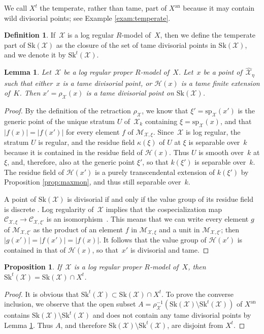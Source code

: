 \documentclass[11pt]{article}
\let\mathcal\mathscr
\newtheorem{prop}[equation]{Proposition}
\newtheorem{lemma}[equation]{Lemma}
\theoremstyle{definition}
\newtheorem{definition}[equation]{Definition}
\numberwithin{equation}{subsection}
\newcommand{\cX}{\ensuremath{\mathscr{X}}}
\newcommand{\an}{\mathrm{an}}
\newcommand{\Sk}{\mathrm{Sk}}
\newcommand{\spe}{\mathrm{sp}}
\begin{document}
We call $X^t$ the temperate, rather than tame, part of $X^{\an}$ because it may contain wild divisorial points; see Example \ref{exam:temperate}.

\begin{definition}
If~$\cX$ is a log regular $R$\nobreakdash-model of~$X$, then we define the temperate part of $\Sk(\cX)$
as the closure of the set of tame divisorial points in $\Sk(\cX)$, and we denote it by $\Sk^t(\cX)$.
\end{definition}

\begin{lemma}\label{lemm:tameretract}
Let~$\cX$ be a log regular proper $R$\nobreakdash-model of~$X$. Let~$x$ be a point of~$\widehat{\cX}_\eta$ such that either~$x$ is a tame divisorial point, or $\mathscr{H}(x)$ is a tame finite extension of~$K$. Then $x'=\rho_{\cX}(x)$ is a tame divisorial point on $\Sk(\cX)$.
\end{lemma}
\begin{proof}
By the definition of the retraction $\rho_{\cX}$, we know that $\xi'=\spe_{\cX}(x')$ is the generic point of the unique stratum $U$ of~$\cX_k$ containing $\xi=\spe_{\cX}(x)$, and that $|f(x)|=|f(x')|$ for every element $f$ of
$\mathcal{M}_{\cX,\xi}$. Since~$\cX$ is log regular, the stratum $U$ is regular, and the residue field $\kappa(\xi)$ of $U$ at $\xi$ is separable over~$k$ because it is contained in the residue field of $\mathscr{H}(x)$. Thus $U$ is smooth over~$k$ at $\xi$, and, therefore, also at the generic point $\xi'$, so that $k(\xi')$ is separable over~$k$. The residue field of $\mathscr{H}(x')$ is a purely transcendental extension of $k(\xi')$ by Proposition \ref{prop:maxmon}, and thus still separable over~$k$.

A point of $\Sk(\cX)$ is divisorial if and only if the value group of its residue field is discrete \cite[2.4.8]{MuNi}. Log regularity of~$\cX$ implies that the cospecialization map $\mathcal{C}_{\cX,\xi}\to \mathcal{C}_{\cX,\xi'}$ is an isomorphism~\cite[3.2.1]{logzeta}. This means that we can write every element $g$ of $\mathcal{M}_{\cX,\xi'}$ as the product of an element $f$ in $\mathcal{M}_{\cX,\xi}$ and a unit in $\mathcal{M}_{\cX,\xi'}$; then $|g(x')|=|f(x')|=|f(x)|$. It follows that the value group of $\mathscr{H}(x')$ is contained in that of $\mathscr{H}(x)$, so that~$x'$ is divisorial and tame.
\end{proof}

\begin{prop}\label{prop:tamesk}
If~$\cX$ is a log regular proper $R$\nobreakdash-model of~$X$, then $\Sk^t(\cX)=\Sk(\cX)\cap X^t$.
\end{prop}
\begin{proof}
It is obvious that $\Sk^t(\cX)\subset \Sk(\cX)\cap X^t$.
To prove the converse inclusion, we observe that the open subset $A=\rho_{\cX}^{-1}(\Sk(\cX)\setminus \Sk^t(\cX))$ of $X^{\an}$ contains $\Sk(\cX)\setminus \Sk^t(\cX)$ and does not contain any tame divisorial points by Lemma \ref{lemm:tameretract}. Thus $A$, and therefore $\Sk(\cX)\setminus \Sk^t(\cX)$, are disjoint from $X^t$.
\end{proof}
\end{document}
